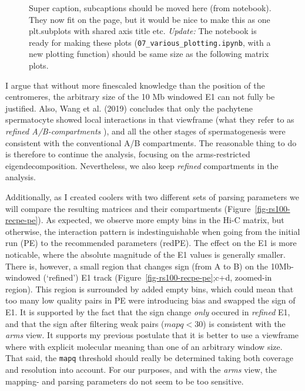 \documentclass[
  11pt,
  a4paper,
]{scrbook}
\let\oldemph\emph
\renewcommand\emph[1]{\oldemph{\color{gray}#1}}
\begin{document}
\begin{figure}[H]
\begin{minipage}{0.48\linewidth}
{}


\end{minipage}%

\caption{\label{fig-e1-matrix-full-arms-10mb-round-spermatid}Super
caption, subcaptions should be moved here (from notebook). They now fit
on the page, but it would be nice to make this as one plt.subplots with
shared axis title etc. \emph{Update:} The notebook is ready for making
these plots (\texttt{07\_various\_plotting.ipynb}, with a new plotting
function) should be same size as the following matrix plots.}

\end{figure}%

I argue that without more finescaled knowledge than the position of the
centromeres, the arbitrary size of the 10 Mb windowed E1 can not fully
be justified. Also, Wang et al. (2019) concludes that only the pachytene
spermatocyte showed local interactions in that viewframe (what they
refer to as \emph{refined A/B-compartments} ), and all the other stages
of spermatogenesis were consistent with the conventional A/B
compartments. The reasonable thing to do is therefore to continue the
analysis, focusing on the arms-restricted eigendecomposition.
Nevertheless, we also keep \emph{refined} compartments in the analysis.

Additionally, as I created coolers with two different sets of parsing
parameters we will compare the resulting matrices and their compartments
(Figure~\ref{fig-rs100-recpe-pe}). As expected, we observe more empty
bins in the Hi-C matrix, but otherwise, the interaction pattern is
indestinguishable when going from the initial run (PE) to the
recommended parameters (redPE). The effect on the E1 is more noticable,
where the absolute magnitude of the E1 values is generally smaller.
There is, however, a small region that changes sign (from A to B) on the
10Mb-windowed (`refined') E1 track (Figure~\ref{fig-rs100-recpe-pe};c+d,
zoomed-in region). This region is surrounded by added empty bins, which
could mean that too many low quality pairs in PE were introducing bias
and swapped the sign of E1. It is supported by the fact that the sign
change \emph{only} occured in \emph{refined} E1, and that the sign after
filtering weak pairs (\(mapq < 30\)) is consistent with the \emph{arms}
view. It supports my previous postulate that it is better to use a
viewframe where with explicit molecular meaning than one of an arbitrary
window size. That said, the \texttt{mapq} threshold should really be
determined taking both coverage and resolution into account. For our
purposes, and with the \emph{arms} view, the mapping- and parsing
parameters do not seem to be too sensitive.
\end{document}
